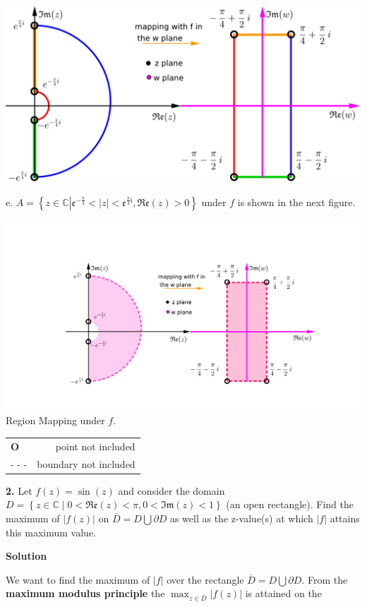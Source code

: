 \documentclass[11pt]{amsart}
\newcommand{\dsp}{\displaystyle}
\newcommand{\BBC}{\mathbb{C}}\newcommand{\mi}{\mathfrak{i}}
\begin{document}
\begin{center}\includegraphics{2d.png}\end{center}
e. $\dsp 
A=\left\{z\in\BBC\left|\mathfrak{e}^{-\frac{\pi}{4}}<|z|<\mathfrak{e}^{\frac{\pi}{4} \mi}, 
\mathfrak{Re}(z)>0\right.\right\}$ under $f$ is shown in the next figure.
\begin{center}\includegraphics{2e.png}
Region Mapping under $f$.\\\begin{tabular}{l|r}\textbf{O}&point not 
included\\{\color{red}- - -}&boundary not included\end{tabular}\end{center}
\textbf{2.} Let $f(z)=\sin(⁡z)$ and consider the domain $\dsp D=\left\{z\in\BBC\;\left| \;
0<\mathfrak{Re}(z)<\pi, 0<\mathfrak{Im}(z)<1\right.\right\}$ 
(an open rectangle). Find the maximum of $\dsp\left|f(z)\right|$ on $\dsp\overline{D}=D\bigcup\partial D$ as well as the z-value(s) at 
which $\dsp |f|$ attains this maximum value.
\begin{center}
\textbf{Solution}
\end{center}
We want to find the maximum of $\dsp |f|$ over the rectangle 
$\dsp\overline{D}=D\bigcup\partial D$. From the \textbf{maximum modulus 
principle} the $\dsp \max_{z\in \overline{D}}\left|f(z)\right|$ is attained on the 
\end{document}
